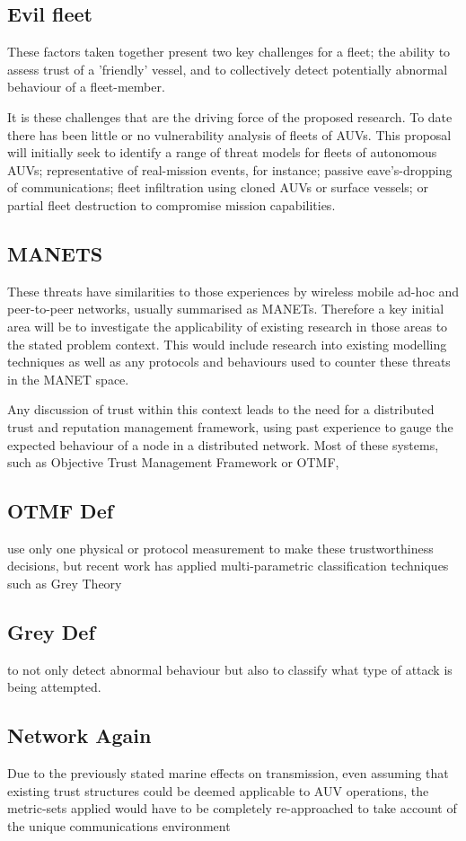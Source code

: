 \documentclass[oneside,9pt,a4paper]{Latex/Classes/PhDthesisPSnPDF}
\begin{document}
\subsection{Evil fleet}  These factors taken together present two key challenges for a
fleet; the ability to assess trust of a 'friendly' vessel, and to collectively
detect potentially abnormal behaviour of a fleet-member.

It is these challenges that are the driving force of the proposed research. To
date there has been little or no vulnerability analysis of fleets of AUVs. This
proposal will initially seek to identify a range of threat models for fleets of
autonomous AUVs; representative of real-mission events, for instance; passive
eave's-dropping of communications; fleet infiltration using cloned AUVs or
surface vessels; or partial fleet destruction to compromise mission
capabilities.

\subsection{MANETS}  These threats have similarities to those experiences by wireless
mobile ad-hoc and peer-to-peer networks, usually summarised as MANETs. Therefore
a key initial area will be to investigate the applicability of existing research
in those areas to the stated problem context. This would include research into
existing modelling techniques as well as any protocols and behaviours used to
counter these threats in the MANET space.

Any discussion of trust within this context leads to the need for a distributed
trust and reputation management framework, using past experience to gauge the
expected behaviour of a node in a distributed network. Most of these systems,
such as Objective Trust Management Framework or OTMF, \subsection{OTMF Def}  use only
one physical or protocol measurement to make these trustworthiness decisions,
but recent work has applied multi-parametric classification techniques such as
Grey Theory \subsection{Grey Def}  to not only detect abnormal behaviour but also to
classify what type of attack is being attempted.

\subsection{Network Again}  Due to the previously stated marine effects on transmission,
even assuming that existing trust structures could be deemed applicable to AUV
operations, the metric-sets applied would have to be completely re-approached to
take account of the unique communications environment
\end{document}
